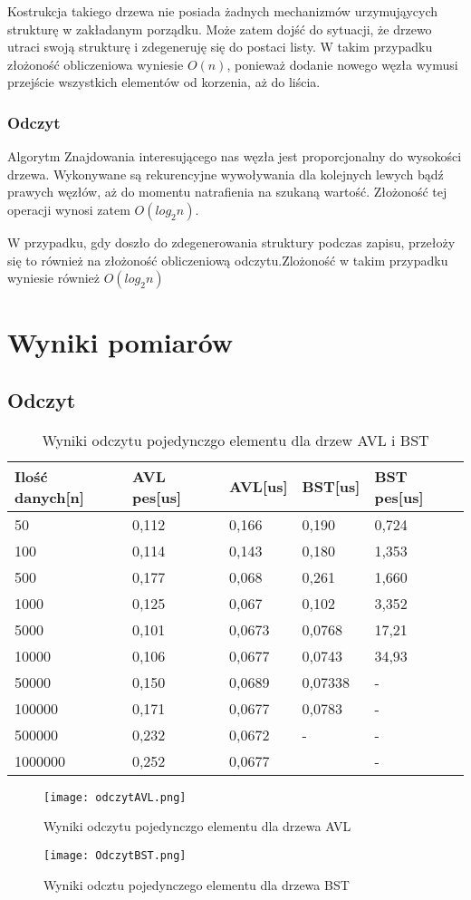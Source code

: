 \documentclass[12pt,a4paper,titlepage]{article}
\begin{document}
Kostrukcja takiego drzewa nie posiada żadnych mechanizmów urzymująycych strukturę w zakładanym porządku.
Może zatem dojść do sytuacji, że drzewo utraci swoją strukturę i zdegeneruję się do postaci listy.
W takim przypadku złożoność obliczeniowa wyniesie $O(n)$, ponieważ dodanie nowego węzła wymusi przejście wszystkich elementów od korzenia, aż do liścia.
\subsubsection{Odczyt}
Algorytm Znajdowania interesującego nas węzła jest proporcjonalny do wysokości drzewa.
Wykonywane są rekurencyjne wywoływania dla kolejnych lewych bądź prawych węzłów, aż do momentu natrafienia na szukaną wartość. Złożoność tej operacji wynosi zatem $O(log_2n)$.

W przypadku, gdy doszło do zdegenerowania struktury podczas zapisu, przełoży się to również na złożoność obliczeniową odczytu.Zlożoność w takim przypadku wyniesie również $O(log_2n)$
\section{Wyniki pomiarów}
\subsection{Odczyt}
\begin{table}[h]
\begin{tabular}{|l|l|l|l|l|}
\hline
Ilość danych[n] & AVL pes[us] &AVL[us]   & BST[us] & BST pes[us]  \\ \hline
50 &0,112 &0,166  &0,190 & 0,724\\ \hline
100 &0,114  &0,143  &0,180  & 1,353 \\ \hline
500 &0,177  &0,068  &0,261  &1,660  \\ \hline
1000 &0,125  &0,067  &0,102  &3,352  \\ \hline
5000 &0,101  &0,0673  &0,0768  &17,21  \\ \hline
10000 &0,106  &0,0677  &0,0743  & 34,93 \\ \hline
50000 &0,150  &0,0689  &0,07338  &-  \\ \hline
100000 &0,171  &0,0677  &0,0783  &-  \\ \hline
500000 &0,232  & 0,0672 &-  &-  \\ \hline
1000000 &0,252  &0,0677  &  &-  \\ \hline
\end{tabular}
\caption{Wyniki odczytu pojedynczgo elementu dla drzew AVL i BST}
\end{table}
\newpage
\begin{figure}[!htbp]
\texttt{[image: odczytAVL.png]}
\caption{Wyniki odczytu pojedynczgo elementu dla drzewa AVL}
\end{figure}
\newpage
\begin{figure}[!htbp]
\texttt{[image: OdczytBST.png]}
\caption{Wyniki odcztu pojedynczego elementu dla drzewa BST}
\end{figure}
\end{document}

